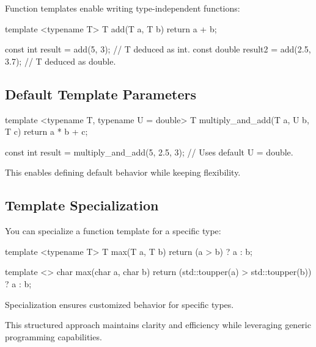 Function templates enable writing type-independent functions:

\begin{codeblock}[language=C++]
template <typename T>
T add(T a, T b) {
    return a + b;
}

const int result = add(5, 3); // T deduced as int.
const double result2 = add(2.5, 3.7); // T deduced as double.
\end{codeblock}

\subsection{Default Template Parameters}

\begin{codeblock}[language=C++]
template <typename T, typename U = double>
T multiply_and_add(T a, U b, T c) {
    return a * b + c;
}

const int result = multiply_and_add(5, 2.5, 3); // Uses default U = double.
\end{codeblock}

This enables defining default behavior while keeping flexibility.

\subsection{Template Specialization}

You can specialize a function template for a specific type:

\begin{codeblock}[language=C++]
template <typename T>
T max(T a, T b) {
    return (a > b) ? a : b;
}

template <>
char max(char a, char b) {
    return (std::toupper(a) > std::toupper(b)) ? a : b;
}
\end{codeblock}

Specialization ensures customized behavior for specific types.

This structured approach maintains clarity and efficiency while leveraging generic programming capabilities.

